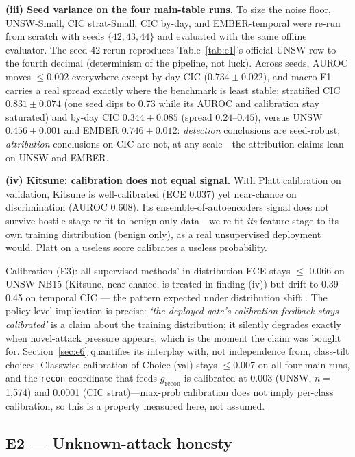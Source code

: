 \documentclass[sigconf,anonymous=false]{acmart}
\begin{document}
\textbf{(iii) Seed variance on the four main-table runs.} To size the noise floor, UNSW-Small, CIC strat-Small, CIC by-day, and EMBER-temporal were re-run from scratch with seeds $\{42,43,44\}$ and evaluated with the same offline evaluator. The seed-42 rerun reproduces Table~\ref{tab:e1}'s official UNSW row to the fourth decimal (determinism of the pipeline, not luck). Across seeds, AUROC moves $\le$0.002 everywhere except by-day CIC ($0.734\pm0.022$), and macro-F1 carries a real spread exactly where the benchmark is least stable: stratified CIC $0.831\pm0.074$ (one seed dips to 0.73 while its AUROC and calibration stay saturated) and by-day CIC $0.344\pm0.085$ (spread $0.24$--$0.45$), versus UNSW $0.456\pm0.001$ and EMBER $0.746\pm0.012$: \emph{detection} conclusions are seed-robust; \emph{attribution} conclusions on CIC are not, at any scale---the attribution claims lean on UNSW and EMBER.

\textbf{(iv) Kitsune: calibration does not equal signal.} With Platt calibration on validation, Kitsune is well-calibrated (ECE 0.037) yet near-chance on discrimination (AUROC 0.608). Its ensemble-of-autoencoders signal does not survive hostile-stage re-fit to benign-only data---we re-fit \emph{its} feature stage to its own training distribution (benign only), as a real unsupervised deployment would. Platt on a useless score calibrates a useless probability.

Calibration (E3): all supervised methods' in-distribution ECE stays $\le$ 0.066 on UNSW-NB15 (Kitsune, near-chance, is treated in finding (iv)) but drift to 0.39--0.45 on temporal CIC --- the pattern expected under distribution shift \cite{ovadia2019trust}. The policy-level implication is precise: \emph{`the deployed gate's calibration feedback stays calibrated'} is a claim about the training distribution; it silently degrades exactly when novel-attack pressure appears, which is the moment the claim was bought for. Section~\ref{sec:e6} quantifies its interplay with, not independence from, class-tilt choices. Classwise calibration of Choice (val) stays $\le$0.007 on all four main runs, and the \texttt{recon} coordinate that feeds $g_{\mathrm{recon}}$ is calibrated at 0.003 (UNSW, $n{=}$1{,}574) and 0.0001 (CIC strat)---max-prob calibration does not imply per-class calibration, so this is a property measured here, not assumed.

\subsection{E2 --- Unknown-attack honesty}
\label{sec:e2}
\end{document}
